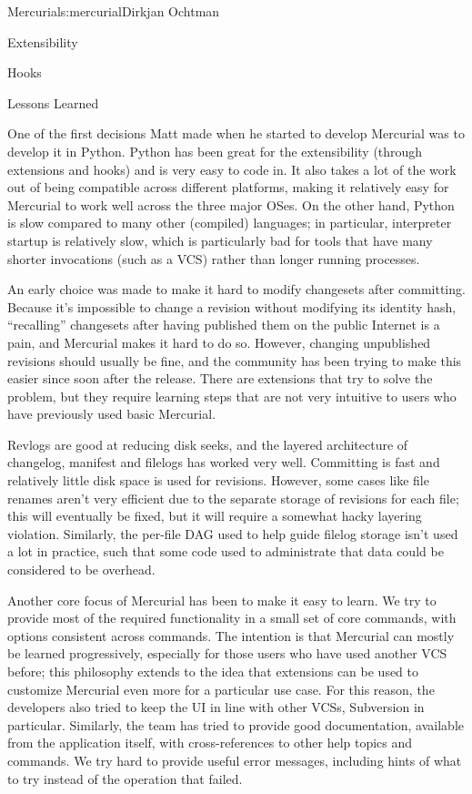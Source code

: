 \begin{aosachapter}{Mercurial}{s:mercurial}{Dirkjan Ochtman}
\begin{aosasect1}{Extensibility}
\begin{aosasect2}{Hooks}
\end{aosasect2}

\end{aosasect1}

\begin{aosasect1}{Lessons Learned}

One of the first decisions Matt made when he started to develop
Mercurial was to develop it in Python. Python has been great for the
extensibility (through extensions and hooks) and is very easy to code
in. It also takes a lot of the work out of being compatible across
different platforms, making it relatively easy for Mercurial to work
well across the three major OSes. On the other hand, Python is slow
compared to many other (compiled) languages; in particular,
interpreter startup is relatively slow, which is particularly bad for
tools that have many shorter invocations (such as a VCS) rather than
longer running processes.

An early choice was made to make it hard to modify changesets after
committing. Because it's impossible to change a revision without
modifying its identity hash, ``recalling'' changesets after having
published them on the public Internet is a pain, and Mercurial makes
it hard to do so. However, changing unpublished revisions should
usually be fine, and the community has been trying to make this easier
since soon after the release. There are extensions that try to solve
the problem, but they require learning steps that are not very
intuitive to users who have previously used basic Mercurial.

Revlogs are good at reducing disk seeks, and the layered architecture
of changelog, manifest and filelogs has worked very well. Committing
is fast and relatively little disk space is used for revisions.
However, some cases like file renames aren't very efficient due to
the separate storage of revisions for each file; this will eventually
be fixed, but it will require a somewhat hacky layering violation.
Similarly, the per-file DAG used to help guide filelog storage isn't
used a lot in practice, such that some code used to administrate
that data could be considered to be overhead.

Another core focus of Mercurial has been to make it easy to learn.  We
try to provide most of the required functionality in a small set of
core commands, with options consistent across commands. The intention
is that Mercurial can mostly be learned progressively, especially for
those users who have used another VCS before; this philosophy extends
to the idea that extensions can be used to customize Mercurial even
more for a particular use case. For this reason, the developers also
tried to keep the UI in line with other VCSs, Subversion in
particular.  Similarly, the team has tried to provide good
documentation, available from the application itself, with
cross-references to other help topics and commands. We try hard to
provide useful error messages, including hints of what to try instead
of the operation that failed.


\end{aosasect1}
\end{aosachapter}
